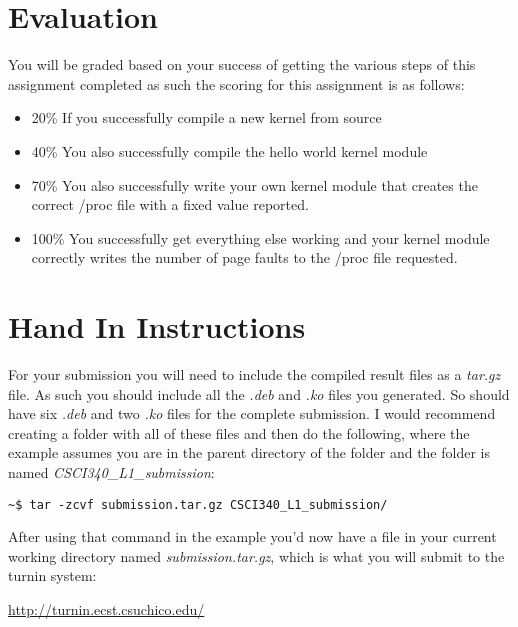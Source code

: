 \documentclass[11pt]{article}
\begin{document}
\section*{Evaluation}

You will be graded based on your success of getting the various steps of this assignment completed as such the scoring for this assignment is as follows:

\begin{itemize}
\item 20\% If you successfully compile a new kernel from source
\item 40\% You also successfully compile the hello world kernel module
\item 70\% You also successfully write your own kernel module that creates the correct /proc file with a fixed value reported.
\item 100\% You successfully get everything else working and your kernel module correctly writes the number of page faults to the /proc file requested. 
\end{itemize}


\section*{Hand In Instructions}

For your submission you will need to include the compiled result files as a \emph{tar.gz} file. As such you should include all the \emph{.deb} and \emph{.ko} files you generated. So should have six \emph{.deb} and two \emph{.ko} files for the complete submission. I would recommend creating a folder with all of these files and then do the following, where the example assumes you are in the parent directory of the folder and the folder is named \emph{CSCI340\_L1\_submission}:

\begin{verbatim}
~$ tar -zcvf submission.tar.gz CSCI340_L1_submission/
\end{verbatim}

After using that command in the example you'd now have a file in your current working directory named \emph{submission.tar.gz}, which is what you will submit to the turnin system:

\url{http://turnin.ecst.csuchico.edu/}
\end{document}
